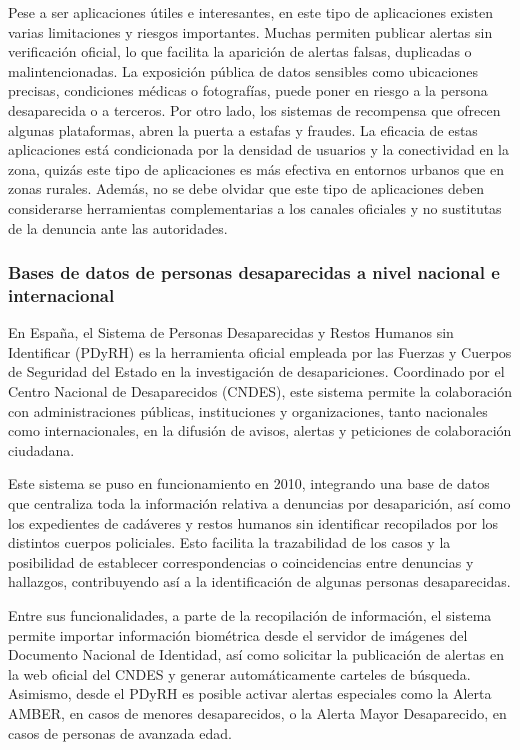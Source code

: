     Pese a ser aplicaciones útiles e interesantes, en este tipo de aplicaciones existen varias limitaciones y riesgos importantes. Muchas permiten publicar alertas sin verificación oficial, lo que facilita la aparición de alertas falsas, duplicadas o malintencionadas. La exposición pública de datos sensibles como ubicaciones precisas, condiciones médicas o fotografías, puede poner en riesgo a la persona desaparecida o a terceros. Por otro lado, los sistemas de recompensa que ofrecen algunas plataformas, abren la puerta a estafas y fraudes. La eficacia de estas aplicaciones está condicionada por la densidad de usuarios y la conectividad en la zona, quizás este tipo de aplicaciones es más efectiva en entornos urbanos que en zonas rurales. Además, no se debe olvidar que este tipo de aplicaciones deben considerarse herramientas complementarias a los canales oficiales y no sustitutas de la denuncia ante las autoridades.

    

    \subsubsection{Bases de datos de personas desaparecidas a nivel nacional e internacional}
    
    En España, el Sistema de Personas Desaparecidas y Restos Humanos sin Identificar (PDyRH) es la herramienta oficial empleada por las Fuerzas y Cuerpos de Seguridad del Estado en la investigación de desapariciones. Coordinado por el Centro Nacional de Desaparecidos (CNDES), este sistema permite la colaboración con administraciones públicas, instituciones y organizaciones, tanto nacionales como internacionales, en la difusión de avisos, alertas y peticiones de colaboración ciudadana. \cite{plan_desaparecidos_2022, cndesprotocoloFFCC}
    
    Este sistema se puso en funcionamiento en 2010, integrando una base de datos que centraliza toda la información relativa a denuncias por desaparición, así como los expedientes de cadáveres y restos humanos sin identificar recopilados por los distintos cuerpos policiales. Esto facilita la trazabilidad de los casos y la posibilidad de establecer correspondencias o coincidencias entre denuncias y hallazgos, contribuyendo así a la identificación de algunas personas desaparecidas.
    
    Entre sus funcionalidades, a parte de la recopilación de información, el sistema permite importar información biométrica desde el servidor de imágenes del Documento Nacional de Identidad, así como solicitar la publicación de alertas en la web oficial del CNDES y generar automáticamente carteles de búsqueda. Asimismo, desde el PDyRH es posible activar alertas especiales como la Alerta AMBER, en casos de menores desaparecidos, o la Alerta Mayor Desaparecido, en casos de personas de avanzada edad.
    
